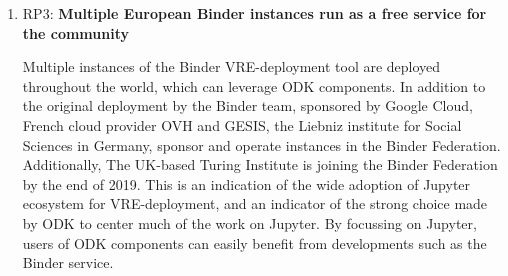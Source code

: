 \begin{enumerate}
\item RP3: \textbf{Multiple European Binder instances run as a free service for the community}

Multiple instances of the Binder VRE-deployment tool
are deployed throughout the world,
which can leverage ODK components.
In addition to the original deployment by the Binder team,
sponsored by Google Cloud,
French cloud provider OVH
and GESIS,
the Liebniz institute for Social Sciences in Germany,
sponsor and operate instances in the Binder Federation.
Additionally,
The UK-based Turing Institute is joining the Binder Federation by the end of 2019.
This is an indication of the wide adoption of Jupyter ecosystem for VRE-deployment,
and an indicator of the strong choice made by ODK
to center much of the work on Jupyter.
By focussing on Jupyter,
users of ODK components can easily benefit
from developments such as the Binder service.







\end{enumerate}
